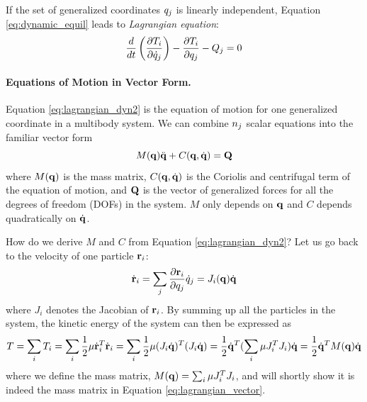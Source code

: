 If the set of generalized coordinates $q_j$ is linearly
independent, Equation \ref{eq:dynamic_equil} leads to
\emph{Lagrangian equation}:
\begin{equation}\label{eq:lagrangian_dyn2}
    \frac{d}{dt} \left( \frac{\partial T_i}{\partial
    \dot{q}_j} \right) - \frac{\partial T_i}{\partial
    q_j} - Q_{j} = 0
\end{equation}

\paragraph{Equations of Motion in Vector Form.} Equation
\ref{eq:lagrangian_dyn2} is the equation of motion for one generalized coordinate in a
multibody system. We can combine $n_j$  scalar equations into
the familiar vector form
\begin{equation}\label{eq:lagrangian_vector}
M(\mathbf{q}) \ddot{\mathbf{q}} + C(\mathbf{q}, \dot{\mathbf{q}}) = \mathbf{Q} 
\end{equation}
where $M(\mathbf{q})$ is the mass matrix, $C(\mathbf{q}, \dot{\mathbf{q}})$ is the
Coriolis and centrifugal term of the equation of motion, and $\mathbf{Q}$
is the vector of generalized forces for all the degrees of freedom
(DOFs) in the system. $M$ only depends on $\mathbf{q}$ and $C$ depends
quadratically on $\dot{\mathbf{q}}$.

How do we derive $M$ and $C$ from Equation \ref{eq:lagrangian_dyn2}?
Let us go back to the velocity of one particle $\mathbf{r}_i$:
\begin{equation}
\dot{\mathbf{r}}_i = \sum_j \frac{\partial
  \mathbf{r}_i}{\partial q_j} \dot{q}_j = J_i(\mathbf{q}) \dot{\mathbf{q}}
\end{equation}
where $J_i$ denotes the Jacobian of $\mathbf{r}_i$. By summing up
all the particles in the system, the kinetic
energy of the system can then be expressed as
\begin{equation}
\label{eq:kinetic_vector}
T = \sum_i T_i = \sum_i \frac{1}{2}  \mathbf{\mu} \dot{\mathbf{r}}_i^{T}
    \dot{\mathbf{r}}_i = \sum_i \frac{1}{2}  \mathbf{\mu} (J_i
    \dot{\mathbf{q}})^T(J_i \dot{\mathbf{q}}) = \frac{1}{2} \dot{\mathbf{q}}^T
    (\sum_i \mathbf{\mu} J_i^TJ_i) \dot{\mathbf{q}} = \frac{1}{2}
    \dot{\mathbf{q}}^T M(\mathbf{q}) \dot{\mathbf{q}}
\end{equation}
where we define the mass matrix, $M(\mathbf{q}) = \sum_i \mathbf{\mu}
J_i^TJ_i$, and will shortly show it is indeed the mass matrix in
Equation \ref{eq:lagrangian_vector}.

